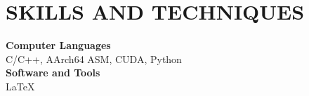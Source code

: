 \section*{SKILLS AND TECHNIQUES}

\noindent
\textbf{Computer Languages} \\
C/C++, AArch64 ASM, CUDA, Python \\

\noindent
\textbf{Software and Tools} \\
LaTeX\\
